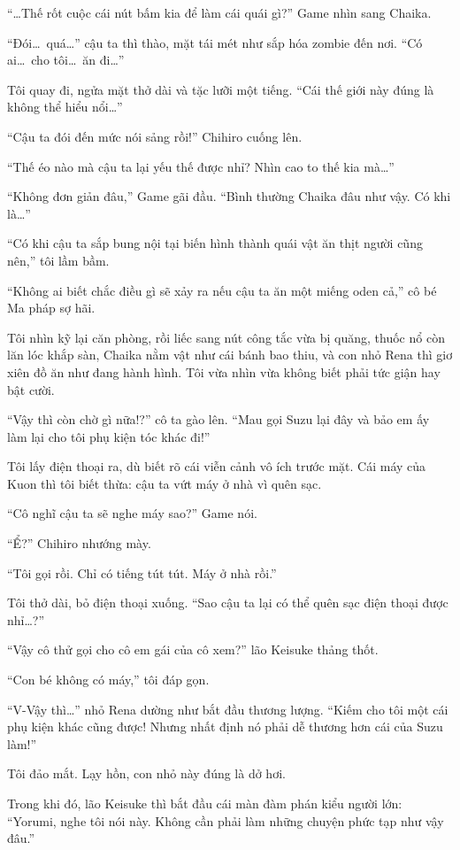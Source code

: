 \documentclass[../main.tex]{subfiles}
\begin{document}
``\dots Thế rốt cuộc cái nút bấm kia để làm cái quái gì?'' Game nhìn sang Chaika.

``Đói\dots\ quá\dots'' cậu ta thì thào, mặt tái mét như sắp hóa zombie đến nơi. ``Có ai\dots\ cho tôi\dots\ ăn đi\dots''

Tôi quay đi, ngửa mặt thở dài và tặc lưỡi một tiếng. ``Cái thế giới này đúng là không thể hiểu nổi\dots''

``Cậu ta đói đến mức nói sảng rồi!'' Chihiro cuống lên.

``Thế éo nào mà cậu ta lại yếu thế được nhỉ? Nhìn cao to thế kia mà\dots''

``Không đơn giản đâu,'' Game gãi đầu. ``Bình thường Chaika đâu như vậy. Có khi là\dots''

``Có khi cậu ta sắp bung nội tại biến hình thành quái vật ăn thịt người cũng nên,'' tôi lầm bầm.

``Không ai biết chắc điều gì sẽ xảy ra nếu cậu ta ăn một miếng oden cả,'' cô bé Ma pháp sợ hãi.

Tôi nhìn kỹ lại căn phòng, rồi liếc sang nút công tắc vừa bị quăng, thuốc nổ còn lăn lóc khắp sàn, Chaika nằm vật như cái bánh bao thiu, và con nhỏ Rena thì giơ xiên đồ ăn như đang hành hình. Tôi vừa nhìn vừa không biết phải tức giận hay bật cười.

``Vậy thì còn chờ gì nữa!?'' cô ta gào lên. ``Mau gọi Suzu lại đây và bảo em ấy làm lại cho tôi phụ kiện tóc khác đi!''

Tôi lấy điện thoại ra, dù biết rõ cái viễn cảnh vô ích trước mặt. Cái máy của Kuon thì tôi biết thừa: cậu ta vứt máy ở nhà vì quên sạc.

``Cô nghĩ cậu ta sẽ nghe máy sao?'' Game nói.

``Ể?'' Chihiro nhướng mày.

``Tôi gọi rồi. Chỉ có tiếng tút tút. Máy ở nhà rồi.''

Tôi thở dài, bỏ điện thoại xuống. ``Sao cậu ta lại có thể quên sạc điện thoại được nhỉ\dots?''

``Vậy cô thử gọi cho cô em gái của cô xem?'' lão Keisuke thảng thốt.

``Con bé không có máy,'' tôi đáp gọn.

``V-Vậy thì\dots'' nhỏ Rena dường như bắt đầu thương lượng. ``Kiếm cho tôi một cái phụ kiện khác cũng được! Nhưng nhất định nó phải dễ thương hơn cái của Suzu làm!''

Tôi đảo mắt. Lạy hồn, con nhỏ này đúng là dở hơi.

Trong khi đó, lão Keisuke thì bắt đầu cái màn đàm phán kiểu người lớn: ``Yorumi, nghe tôi nói này. Không cần phải làm những chuyện phức tạp như vậy đâu.''
\end{document}

